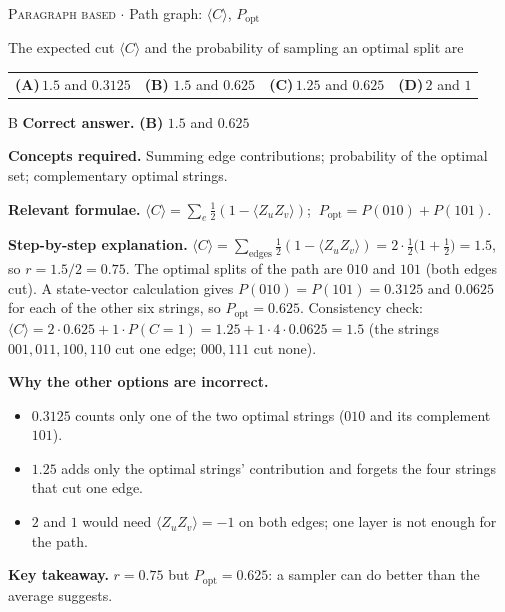 \documentclass[11pt,a4paper]{article}
\newcommand{\optlabel}[1]{\textbf{(#1)}}
\newcommand{\correctlabel}[1]{\textcolor{okgreen}{\textbf{(#1)}\,\ding{51}}}
\newenvironment{qitem}[1]{\begin{list}{}{\setlength{\leftmargin}{3.3em}\setlength{\labelwidth}{3.1em}%
  \setlength{\labelsep}{0.2em}\setlength{\topsep}{3pt}\setlength{\parsep}{3pt}}\item[\textbf{Q.#1}\hfill]}{\end{list}}
\newcommand{\qsep}{\par\vspace{2pt}{\color{black!15}\hrule}\vspace{4pt}}
\newcommand{\qmeta}[2]{{\footnotesize\color{black!60}\textsc{#1} \;$\cdot$\; #2}\par}
\begin{document}
\begin{qitem}{60}
\qmeta{Paragraph based}{Path graph: $\langle C\rangle$, $P_{\text{opt}}$}
The expected cut $\langle C\rangle$ and the probability of sampling an optimal split are
\par\smallskip\noindent\begin{tabularx}{\linewidth}{@{}*{4}{L}@{}}
\optlabel{A}\,$1.5$ and $0.3125$ & \correctlabel{B}\,$1.5$ and $0.625$ & \optlabel{C}\,$1.25$ and $0.625$ & \optlabel{D}\,$2$ and $1$
\end{tabularx}
\end{qitem}
\begin{solbox}{B}
\textbf{\color{brand}Correct answer.} \textcolor{okgreen}{\textbf{(B)}} $1.5$ and $0.625$

\textbf{\color{brand}Concepts required.} Summing edge contributions; probability of the optimal set; complementary optimal strings.

\textbf{\color{brand}Relevant formulae.} $\langle C\rangle = \sum_e\tfrac12(1 - \langle Z_uZ_v\rangle)$; $\ P_{\text{opt}} = P(010) + P(101)$.

\textbf{\color{brand}Step-by-step explanation.} $\langle C\rangle = \sum_{\text{edges}}\tfrac12(1 - \langle Z_uZ_v\rangle) = 2\cdot\tfrac12\big(1 + \tfrac12\big) = 1.5$, so $r = 1.5/2 = 0.75$.
The optimal splits of the path are $010$ and $101$ (both edges cut). A state-vector calculation gives
$P(010) = P(101) = 0.3125$ and $0.0625$ for each of the other six strings, so $P_{\text{opt}} = 0.625$.
Consistency check: $\langle C\rangle = 2\cdot0.625 + 1\cdot P(C = 1) = 1.25 + 1\cdot 4\cdot0.0625 = 1.5$ (the strings $001, 011, 100, 110$ cut one
edge; $000, 111$ cut none).

\textbf{\color{brand}Why the other options are incorrect.}
\begin{itemize}[leftmargin=2.4em, itemsep=1pt, topsep=2pt]
\item[\textbf{(A)}] $0.3125$ counts only one of the two optimal strings ($010$ and its complement $101$).
\item[\textbf{(C)}] $1.25$ adds only the optimal strings' contribution and forgets the four strings that cut one edge.
\item[\textbf{(D)}] $2$ and $1$ would need $\langle Z_uZ_v\rangle = -1$ on both edges; one layer is not enough for the path.
\end{itemize}
\textbf{\color{brand}Key takeaway.} $r = 0.75$ but $P_{\text{opt}} = 0.625$: a sampler can do better than the average suggests.
\end{solbox}
\qsep
\end{document}
